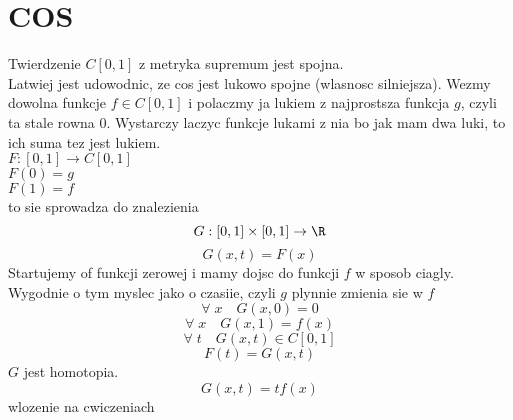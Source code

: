 \documentclass{article}
\begin{document}
\ttfamily
\section*{COS}
Twierdzenie $C[0,1]$ z metryka supremum jest spojna.\\
\dowod
Latwiej jest udowodnic, ze cos jest lukowo spojne (wlasnosc silniejsza). Wezmy dowolna funkcje $f\in C[0,1]$ i polaczmy ja lukiem z najprostsza funkcja $g$, czyli ta stale rowna 0. Wystarczy laczyc funkcje lukami z nia bo jak mam dwa luki, to ich suma tez jest lukiem.\bigskip\\
$F:[0,1]\to C[0,1]$\\
$F(0) = g$\\
$F(1)=f$\\
to sie sprowadza do znalezienia
$$G:[0,1]\times[0,1]\to \R$$
$$G(x,t)=F(x)$$
Startujemy of funkcji zerowej i mamy dojsc do funkcji $f$ w sposob ciagly. Wygodnie o tym myslec jako o czasiie, czyli $g$ plynnie zmienia sie w $f$
$$\forall\;x\quad G(x, 0) = 0$$
$$\forall\;x\quad G(x, 1) = f(x)$$
$$\forall\;t\quad G(x, t) \in C[0,1]$$
$$F(t)=G(x, t)$$
$G$ jest homotopia.
$$G(x, t)= tf(x)$$
wlozenie na cwiczeniach
\end{document}
